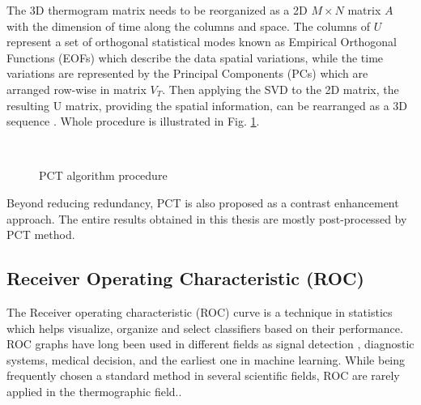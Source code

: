 The 3D thermogram matrix needs to be reorganized as a 2D $M\times N$ matrix $A$ with the dimension of time along the columns and space. The columns of $U$ represent a set of orthogonal statistical modes known as Empirical
Orthogonal Functions (EOFs) which describe the data spatial variations, while the time variations are represented by the Principal Components (PCs) which are arranged row-wise in matrix $V_T$. Then applying the SVD to the 2D matrix, the resulting U matrix, providing the spatial information, can be rearranged as a 3D sequence \citep{Ibarra-Castanedo2006}. Whole procedure is illustrated in Fig. \ref{PCT_SVD}.
\begin{figure}[htbp]
	\centering
	\\
	\caption{PCT algorithm procedure}
	\label{PCT_SVD}
\end{figure}

Beyond reducing redundancy, PCT is also proposed as a contrast enhancement approach.
The entire results obtained in this thesis are mostly post-processed by PCT method.

\subsection{Receiver Operating 	Characteristic (ROC)}
The Receiver operating characteristic (ROC) curve is a technique in statistics which helps visualize, organize and select classifiers based on their performance. ROC graphs have long been used in different fields as signal detection \citep{swets2000better}, diagnostic systems\citep{swets1988measuring}, medical decision\citep{zou2002receiver}, and the earliest one in machine learning\citep{spackman1989signal}. While being frequently chosen a standard method in several scientific fields, ROC are rarely applied in the thermographic field.\citep{Bison2014a}.

